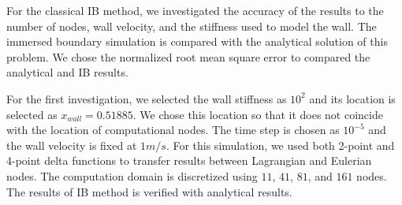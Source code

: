For the classical IB method, we investigated the accuracy of the results to the number of nodes, wall velocity, and the stiffness used to model the wall. The immersed boundary simulation is compared with the analytical solution of this problem. We chose the normalized root mean square error to compared the analytical and IB results.

For the first investigation, we selected the wall stiffness as $10^2$ and its location is selected as $x_{wall} = 0.51885$. We chose this location so that it does not coincide with the location of computational nodes. The time step is chosen as $10^{-5}$ and the wall velocity is fixed at $1 m/s$. For this simulation, we used both 2-point and 4-point delta functions to transfer results between Lagrangian and Eulerian nodes. The computation domain is discretized using $11$, $41$, $81$, and $161$ nodes. The results of IB method is verified with analytical results.

